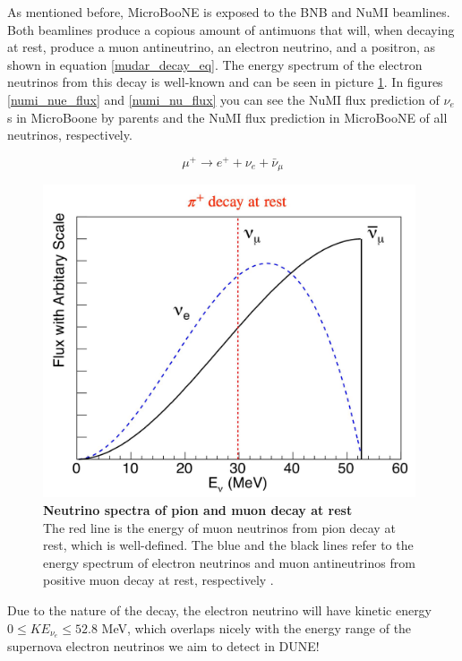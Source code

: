 As mentioned before, MicroBooNE is exposed to the BNB and NuMI beamlines. Both beamlines produce a copious amount of antimuons that will, when decaying at rest, produce a muon antineutrino, an electron neutrino, and a positron, as shown in equation \ref{mudar_decay_eq}. The energy spectrum of the electron neutrinos from this decay is well-known and can be seen in picture \ref{mudar_nue_energy}. In figures \ref{numi_nue_flux} and \ref{numi_nu_flux} you can see the NuMI flux prediction of $\nu_e$s in MicroBoone by parents and the NuMI flux prediction in MicroBooNE of all neutrinos, respectively. 

\begin{equation}
	\mu^{+} \longrightarrow e^{+} + \nu_e + \bar{\nu}_{\mu}
    \label{mudar_decay_eq}
\end{equation}

\begin{figure}[h!]
    \centering
    \includegraphics[width=110mm]{Figures/mudar_nue_energy.jpg}
    \caption[Neutrino spectra of pion and muon decay at rest]{{\textbf{Neutrino spectra of pion and muon decay at rest}}\\ The red line is the energy of muon neutrinos from pion decay at rest, which is well-defined. The blue and the black lines refer to the energy spectrum of electron neutrinos and muon antineutrinos from positive muon decay at rest, respectively \cite{Yang2012}.}
    \label{mudar_nue_energy}
\end{figure}

Due to the nature of the decay, the electron neutrino will have kinetic energy $0 \leqslant KE_{\nu_e} \leqslant 52.8$ MeV, which overlaps nicely with the energy range of the supernova electron neutrinos we aim to detect in DUNE!

